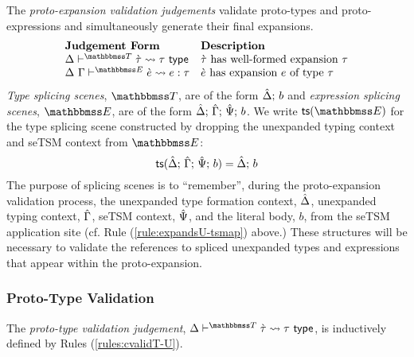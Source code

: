 The \emph{proto-expansion validation judgements} validate proto-types and proto-expressions and simultaneously generate their final expansions.%
\[\begin{array}{ll}
\textbf{Judgement Form} & \textbf{Description}\\
\cvalidT{\Delta}{\tscenev}{\ctau}{\tau} & \text{$\ctau$ has well-formed expansion $\tau$}\\
\cvalidE{\Delta}{\Gamma}{\escenev}{\ce}{e}{\tau} & \text{$\ce$ has expansion $e$ of type $\tau$}
\end{array}\]
\emph{Type splicing scenes}, $\tscenev$, are of the form $\hat{\Delta};\,b$ and \emph{expression splicing scenes}, $\escenev$, are of the form $\hat{\Delta};\,\hat{\Gamma};\,\hat{\Psi};\,b$. We write $\tsfrom{\escenev}$ for the type splicing scene constructed by dropping the unexpanded typing context and seTSM context from $\escenev$:
\[\mathsf{ts}(\hat{\Delta};\,\hat{\Gamma};\,\hat{\Psi};\,b) = \hat{\Delta};\,b\]
The purpose of splicing scenes is to ``remember'', during the proto-expansion validation process, the unexpanded type formation context, $\hat{\Delta}$, unexpanded typing context, $\hat{\Gamma}$, seTSM context, $\hat{\Psi}$, and the literal body, $b$, from the seTSM application site (cf. Rule (\ref{rule:expandsU-tsmap}) above.) These structures will be necessary to validate the references to spliced unexpanded types and expressions that appear within the proto-expansion.

\subsubsection{Proto-Type Validation}\label{sec:SE-proto-type-validation}
The \emph{proto-type validation judgement}, $\cvalidT{\Delta}{\tscenev}{\ctau}{\tau}$, is inductively defined by Rules (\ref{rules:cvalidT-U}).


